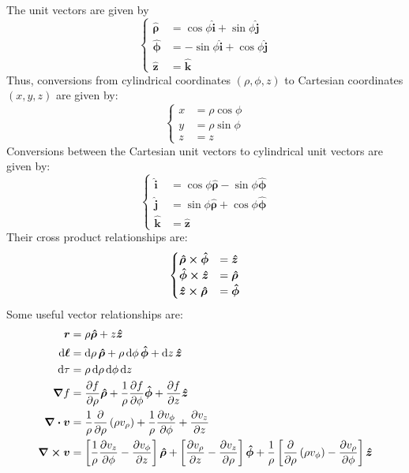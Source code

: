 \documentclass[oneside]{book}
\numberwithin{figure}{section}
\numberwithin{equation}{section}
\newcommand{\paren}[1]{\left(#1\right)}
\newcommand{\bhat}[1]{\bm{\hat{#1}}}
\theoremstyle{definition}
\begin{document}
	The unit vectors are given by
	\begin{equation}
		\begin{cases}
			\bhat{\rho} &= \cos\phi\bhat{i} + \sin\phi\bhat{j}\\
			\bhat{\phi} &= -\sin\phi\bhat{i} + \cos\phi\bhat{j}\\
			\bhat{z} &= \bhat{k}
		\end{cases}
	\end{equation}
	Thus, conversions from cylindrical coordinates $ (\rho, \phi, z) $ to Cartesian coordinates $ (x,y,z) $ are given by:
	\begin{equation}
		\begin{cases}
			x &= \rho\cos\phi\\
			y &= \rho\sin\phi\\
			z &= z
		\end{cases}
	\end{equation}
	Conversions between the Cartesian unit vectors to cylindrical unit vectors are given by:
	\begin{equation}
		\begin{cases}
			\bhat{i} &= \cos\phi\bhat{\rho} - \sin\phi\bhat{\phi}\\
			\bhat{j} &= \sin\phi\bhat{\rho} + \cos\phi\bhat{\phi}\\
			\bhat{k} &= \bhat{z}
		\end{cases}
	\end{equation}
	Their cross product relationships are:
	\begin{equation}
		\begin{cases}
			\bhat{\rho} \cross \bhat{\phi} &= \bhat{z}\\
			\bhat{\phi} \cross \bhat{z} &= \bhat{\rho}\\
			\bhat{z} \cross \bhat{\rho} &= \bhat{\phi}
		\end{cases}
	\end{equation}
	Some useful vector relationships are:
	\begin{align}
		\bm{r} &= \rho\bhat{\rho} + z\bhat{z}\\
		\dd{\bm{\ell}} &= \dd{\rho}\bhat{\rho} + \rho\dd{\phi}\bhat{\phi} + \dd{z}\bhat{z}\\
		\dd{\tau} &= \rho\dd{\rho}\dd{\phi}\dd{z}\\
		\grad{f} &= \pdv{f}{\rho}\bhat{\rho} + \dfrac{1}{\rho}\pdv{f}{\phi}\bhat{\phi} + \pdv{f}{z}\bhat{z}\\
		\div{\bm{v}} &= \dfrac{1}{\rho}\pdv{\rho}\paren{\rho v_\rho} + \dfrac{1}{\rho}\pdv{v_\phi}{\phi} + \pdv{v_z}{z}\\
		\curl{\bm{v}} &= \left[\dfrac{1}{\rho}\pdv{v_z}{\phi} - \pdv{v_\phi}{z}\right]\bhat{\rho} + \left[\pdv{v_\rho}{z} - \pdv{v_z}{\rho}\right]\bhat{\phi} + \dfrac{1}{\rho}\left[\pdv{\rho}\paren{\rho v_\phi} - \pdv{v_\rho}{\phi}\right]\bhat{z}
	\end{align}
\end{document}
